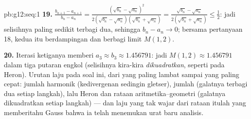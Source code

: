 \begin{solution}{pb:g12:seq:1}
\textbf{19.} $\frac{b_{n+1} - a_{n+1}}{b_n - a_n} =
\frac{(\sqrt{b_n} - \sqrt{a_n})^2}
{2(\sqrt{b_n} - \sqrt{a_n})(\sqrt{b_n} + \sqrt{a_n})}
= \frac{\sqrt{b_n} - \sqrt{a_n}}{2(\sqrt{b_n} + \sqrt{a_n})}
\leq \frac12$: jadi selisihnya paling sedikit terbagi dua, sehingga
$b_n - a_n \to 0$; bersama pertanyaan 18, kedua  itu berdampingan dan
berbagi limit $M(1, 2)$.

\textbf{20.} Iterasi ketiganya memberi
$a_3 \approx b_3 \approx 1.456791$: jadi $M(1, 2) \approx
1.456791$ dalam tiga putaran engkol (selisihnya kira-kira
\emph{dikuadratkan}, seperti pada Heron). Urutan laju  pada soal
ini, dari yang paling lambat sampai yang paling cepat: jumlah harmonik
(kedivergenan sedingin gletser), jumlah  (galatnya terbagi dua setiap
langkah), lalu Heron dan rataan aritmetika--geometri (galatnya dikuadratkan
setiap langkah) --- dan laju yang tak wajar dari rataan itulah yang
memberitahu Gauss bahwa ia telah menemukan urat baru analisis.

\end{solution}

